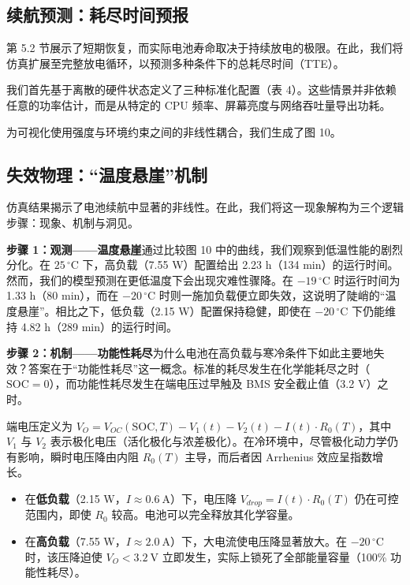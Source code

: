 \documentclass[11pt,a4paper]{ctexart}
\begin{document}
\subsection{续航预测：耗尽时间预报}

第 5.2 节展示了短期恢复，而实际电池寿命取决于持续放电的极限。在此，我们将仿真扩展至完整放电循环，以预测多种条件下的总耗尽时间（TTE）。

我们首先基于离散的硬件状态定义了三种标准化配置（表 4）。这些情景并非依赖任意的功率估计，而是从特定的 CPU 频率、屏幕亮度与网络吞吐量导出功耗。

为可视化使用强度与环境约束之间的非线性耦合，我们生成了图 10。

\subsection{失效物理：“温度悬崖”机制}

仿真结果揭示了电池续航中显著的非线性。在此，我们将这一现象解构为三个逻辑步骤：现象、机制与洞见。

\noindent\textbf{步骤 1：观测——温度悬崖}\quad 通过比较图 10 中的曲线，我们观察到低温性能的剧烈分化。在 $25\,^{\circ}\mathrm{C}$ 下，高负载（7.55 W）配置给出 2.23 h（134 min）的运行时间。然而，我们的模型预测在更低温度下会出现灾难性骤降。在 $-19\,^{\circ}\mathrm{C}$ 时运行时间为 1.33 h（80 min），而在 $-20\,^{\circ}\mathrm{C}$ 时则一施加负载便立即失效，这说明了陡峭的“温度悬崖”。相比之下，低负载（2.15 W）配置保持稳健，即使在 $-20\,^{\circ}\mathrm{C}$ 下仍能维持 4.82 h（289 min）的运行时间。

\noindent\textbf{步骤 2：机制——功能性耗尽}\quad 为什么电池在高负载与寒冷条件下如此主要地失效？答案在于“功能性耗尽”这一概念。标准的耗尽发生在化学能耗尽之时（$\mathrm{SOC}=0$），而功能性耗尽发生在端电压过早触及 BMS 安全截止值（3.2 V）之时。

端电压定义为 $V_O=V_{OC}(\mathrm{SOC},T)-V_1(t)-V_2(t)-I(t)\cdot R_0(T)$，其中 $V_1$ 与 $V_2$ 表示极化电压（活化极化与浓差极化）。在冷环境中，尽管极化动力学仍有影响，瞬时电压降由内阻 $R_0(T)$ 主导，而后者因 Arrhenius 效应呈指数增长。

\begin{itemize}[leftmargin=1.6em,itemsep=0.3em]
\item 在\textbf{低负载}（2.15 W，$I\approx 0.6\ \mathrm{A}$）下，电压降 $V_{drop}=I(t)\cdot R_0(T)$ 仍在可控范围内，即使 $R_0$ 较高。电池可以完全释放其化学容量。
\item 在\textbf{高负载}（7.55 W，$I\approx 2.0\ \mathrm{A}$）下，大电流使电压降显著放大。在 $-20\,^{\circ}\mathrm{C}$ 时，该压降迫使 $V_O<3.2\ \mathrm{V}$ 立即发生，实际上锁死了全部能量容量（100\% 功能性耗尽）。
\end{itemize}
\end{document}
